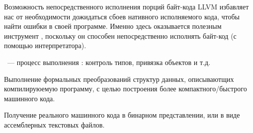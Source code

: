 Возможность непосредственного исполнения порций байт-кода LLVM избавляет нас от
необходимости дожидаться сбоев нативного исполняемого кода, чтобы найти ошибки в
своей программе. Именно здесь оказывается полезным инструмент ,
поскольку он способен непосредственно исполнять байт-код (с помощью
интерпретатора).


\begin{framed}\noindent
{}\ --- процесс выполнения
: контроль типов, привязка объектов и т.д. 
\end{framed}


Выполнение формальных преобразований структур данных, описываютщих
компилируюемую программу, с целью построения более компактного/быстрого
машинного кода.


Получение реального машинного кода в бинарном представлении, или в виде
ассемблерных текстовых файлов.


\secup

